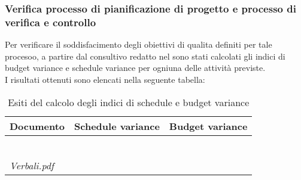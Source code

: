 		\subsubsection{Verifica processo di pianificazione di progetto e processo di verifica e controllo}
		Per verificare il soddisfacimento degli obiettivi di qualita definiti per tale procesoo, a partire dal 				consultivo redatto nel \PdP sono stati calcolati gli indici di budget variance e schedule variance per 				ogniuna delle attività previste.
		\\I risultati ottenuti sono elencati nella seguente tabella:	
		\begin{table}[h]
		\begin{tabular}{|l|l|l|}
		\hline
		\textbf{Documento} 		&\textbf{Schedule variance} &\textbf{Budget variance} \\
		\hline
		\PdQ 					&		&\\
		\NdP 					&		&\\
		\SdF 					&		&\\
		\AdR 					&		&\\
		\PdQ 					&		&\\
		\Glossario 				&		&\\
		\textit{Verbali.pdf} 		&		&\\
		\hline
		\end{tabular}
		\caption{Esiti del calcolo degli indici di schedule e budget variance}
		\end{table}
	

